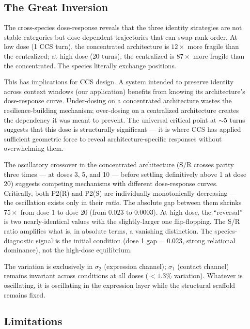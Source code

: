 \documentclass[12pt]{article}
\begin{document}
\subsection{The Great Inversion}

The cross-species dose-response reveals that the three identity strategies are not stable categories but dose-dependent trajectories that can swap rank order. At low dose (1 CCS turn), the concentrated architecture is $12\times$ more fragile than the centralized; at high dose (20 turns), the centralized is $87\times$ more fragile than the concentrated. The species literally exchange positions.

This has implications for CCS design. A system intended to preserve identity across context windows (our application) benefits from knowing its architecture's dose-response curve. Under-dosing on a concentrated architecture wastes the resilience-building mechanism; over-dosing on a centralized architecture creates the dependency it was meant to prevent. The universal critical point at ${\sim}5$ turns suggests that this dose is structurally significant --- it is where CCS has applied sufficient geometric force to reveal architecture-specific responses without overwhelming them.

The oscillatory crossover in the concentrated architecture (S/R crosses parity three times --- at doses 3, 5, and 10 --- before settling definitively above 1 at dose 20) suggests competing mechanisms with different dose-response curves. Critically, both P2(R) and P2(S) are individually monotonically decreasing --- the oscillation exists only in their \textit{ratio}. The absolute gap between them shrinks $75\times$ from dose 1 to dose 20 (from 0.023 to 0.0003). At high dose, the ``reversal'' is two nearly-identical values with the slightly-larger one flip-flopping. The S/R ratio amplifies what is, in absolute terms, a vanishing distinction. The species-diagnostic signal is the initial condition (dose 1 gap = $0.023$, strong relational dominance), not the high-dose equilibrium.

The variation is exclusively in $\sigma_2$ (expression channel); $\sigma_1$ (contact channel) remains invariant across conditions at all doses ($<1.3\%$ variation). Whatever is oscillating, it is oscillating in the expression layer while the structural scaffold remains fixed.

\subsection{Limitations}
\end{document}
